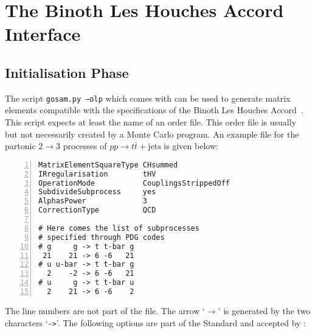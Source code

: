 \chapter{The Binoth Les Houches Accord Interface}
\label{sec:blha}

\section{Initialisation Phase}
The script \texttt{gosam.py --olp} which comes with \gosamv{} can be used to generate
matrix elements compatible with the specifications of the Binoth Les Houches
Accord~\cite{Binoth:2010xt,Alioli:2013nda}. This script expects at least the name of an order file.
This order file is usually but not necessarily created by a Monte Carlo program. An
example file for the partonic $2\to3$ processes of $pp\rightarrow t\bar{t}+\text{jets}$
is given below:
\begin{lstlisting}[language=olp,numbers=left]
MatrixElementSquareType CHsummed
IRregularisation        tHV
OperationMode           CouplingsStrippedOff
SubdivideSubprocess     yes
AlphasPower             3
CorrectionType          QCD

# Here comes the list of subprocesses
# specified through PDG codes
# g     g -> t t-bar g
 21    21 -> 6 -6   21
# u u-bar -> t t-bar g
  2    -2 -> 6 -6   21
# u     g -> t t-bar u
  2    21 -> 6 -6    2
\end{lstlisting}
The line numbers are not part of the file.
The arrow `$\rightarrow$' is generated by the two characters `\verb|->|'.
The following options are part of the Standard and accepted by
\gosamv{}:
\lstset{language=olp}
